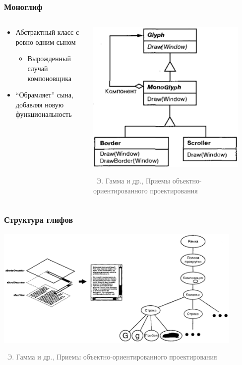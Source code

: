 \documentclass[xetex,mathserif,serif]{beamer}
\newcommand{\attribution}[1] {
	\vspace{-5mm}\begin{flushright}\begin{scriptsize}\textcolor{gray}{\textcopyright\, #1}\end{scriptsize}\end{flushright}
}
\begin{document}
	\begin{frame}
		\frametitle{Моноглиф}
		\begin{columns}
			\begin{column}{0.6\textwidth}
				\begin{itemize}
					\item Абстрактный класс с ровно одним сыном
					\begin{itemize}
						\item Вырожденный случай компоновщика
					\end{itemize}
					\item ``Обрамляет'' сына, добавляя новую функциональность
				\end{itemize}
			\end{column}
			\begin{column}{0.4\textwidth}
				\begin{center}
					\includegraphics[width=0.9\textwidth]{monoglyph.png}
					\attribution{Э. Гамма и др., Приемы объектно-ориентированного проектирования}
				\end{center}
			\end{column}
		\end{columns}
	\end{frame}

	\begin{frame}
		\frametitle{Структура глифов}
		\begin{center}
			\includegraphics[width=0.9\textwidth]{glyphStructure.png}
			\attribution{Э. Гамма и др., Приемы объектно-ориентированного проектирования}
		\end{center}
	\end{frame}
\end{document}
